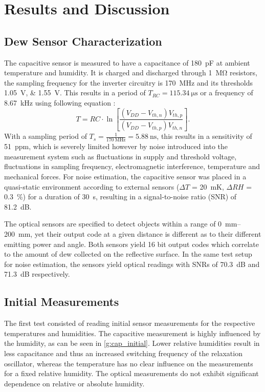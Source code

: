 \documentclass[conference,a4paper]{IEEEtran}
\begin{document}
\section{Results and Discussion}
\subsection{Dew Sensor Characterization}
The capacitive sensor is measured to have a capacitance of \qty{180}{\pico\F} at ambient temperature and humidity. It is charged and discharged through \qty{1}{\mega\ohm} resistors, the sampling frequency for the inverter circuitry is \qty{170}{\mega\Hz} and its thresholds \qtylist{1.05; 1.55}{\V}. This results in a period of $T_{RC} = \qty{115.34}{\us}$ or a frequency of \qty{8.67}{\kilo\Hz} using following equation \autocite{texasinstrumentsRelaxationOscillatorCircuit2018}:
\begin{equation}
    \label{e:cap_period}
    T = RC \cdot \ln\left[ \frac{(V_{DD}-V_{th,n})V_{th,p}}{(V_{DD}-V_{th,p})V_{th,n}}\right].
\end{equation}
With a sampling period of $T_{s} = \frac{1}{\qty{170}{\mega\Hz}} = \qty{5.88}{\ns}$, this results in a sensitivity of \qty{51}{ppm}, which is severely limited however by noise introduced into the measurement system such as fluctuations in supply and threshold voltage, fluctuations in sampling frequency, electromagnetic interference, temperature and mechanical forces. For noise estimation, the capacitive sensor was placed in a quasi-static environment according to external sensors ($\Delta T$ = \qty[retain-explicit-plus]{20}{\milli\K}, $\Delta RH$ = \qty[retain-explicit-plus]{0.3}{\percent}) for a duration of \qty{30}{\s}, resulting in a signal-to-noise ratio (SNR) of \qty{81.2}{\dB}.

The optical sensors are specified to detect objects within a range of \qtyrange{0}{200}{\mm}, yet their output code at a given distance is different as to their different emitting power and angle. Both sensors yield 16 bit output codes which correlate to the amount of dew collected on the reflective surface. In the same test setup for noise estimation, the sensors yield optical readings with SNRs of \qty{70.3}{\dB} and \qty{71.3}{\dB} respectively.

\subsection{Initial Measurements}
The first test consisted of reading initial sensor measurements for the respective temperatures and humidities. The capacitive measurement is highly influenced by the humidity, as can be seen in \cref{g:cap_initial}. Lower relative humidities result in less capacitance and thus an increased switching frequency of the relaxation oscillator, whereas the temperature has no clear influence on the measurements for a fixed relative humidity. 
The optical measurements do not exhibit significant dependence on relative or absolute humidity.
\end{document}
